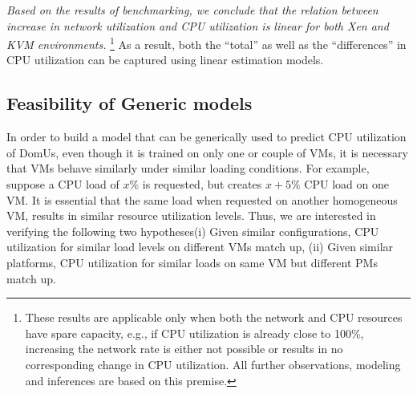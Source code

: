 \textit{Based on the results of benchmarking, we
			  conclude that the relation between increase in network utilization
		  and CPU utilization is linear for both Xen and KVM environments.}
		  \footnote{These results are applicable only when both the network
			  and CPU resources have spare capacity, e.g., if CPU utilization is
			  already close to 100\%, increasing the network rate is either not
			  possible or results in no corresponding change in CPU utilization.
			  All further observations, modeling and inferences are based on this
		  premise.} As a result, both the ``total'' as well as 
		  the ``differences'' in CPU utilization can be
		  captured using linear estimation models.



\subsection{Feasibility of Generic models}
In order to build a model that can be generically used to
predict CPU utilization of DomUs, 
even though it is trained on only one or couple of VMs,
it is necessary that VMs behave similarly under
similar loading conditions. 
For example, suppose a CPU load of
$x\%$ is requested, but creates $x+5\%$ CPU load on one VM.
It is essential that the same load when
requested on another homogeneous VM, results in similar
resource utilization levels. 
Thus, we are interested in verifying the 
following two hypotheses\textemdash{}(i) Given similar 
configurations, CPU utilization for similar load levels on 
different VMs match up, (ii) Given similar platforms, CPU 
utilization for similar loads on same VM but different PMs match up.
 
